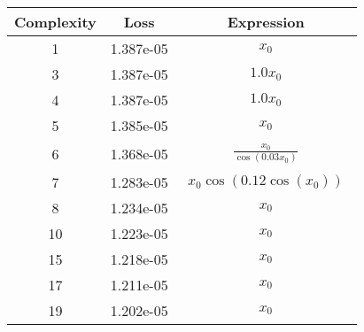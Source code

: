 \begin{center}
        \begin{tabular}{|c|c|c|}
        \hline
        Complexity & Loss & Expression \\
        \hline
        1 & 1.387e-05 & $\begin{aligned}x_{0}\end{aligned}$\\ \hline3 & 1.387e-05 & $\begin{aligned}1.0 x_{0}\end{aligned}$\\ \hline4 & 1.387e-05 & $\begin{aligned}1.0 x_{0}\end{aligned}$\\ \hline5 & 1.385e-05 & $\begin{aligned}x_{0}\end{aligned}$\\ \hline6 & 1.368e-05 & $\begin{aligned}\frac{x_{0}}{\cos{\left(0.03 x_{0} \right)}}\end{aligned}$\\ \hline7 & 1.283e-05 & $\begin{aligned}x_{0} \cos{\left(0.12 \cos{\left(x_{0} \right)} \right)}\end{aligned}$\\ \hline8 & 1.234e-05 & $\begin{aligned}x_{0}\end{aligned}$\\ \hline10 & 1.223e-05 & $\begin{aligned}x_{0}\end{aligned}$\\ \hline15 & 1.218e-05 & $\begin{aligned}x_{0}\end{aligned}$\\ \hline17 & 1.211e-05 & $\begin{aligned}x_{0}\end{aligned}$\\ \hline19 & 1.202e-05 & $\begin{aligned}x_{0}\end{aligned}$\\ \hline\end{tabular}
        \end{center}
        